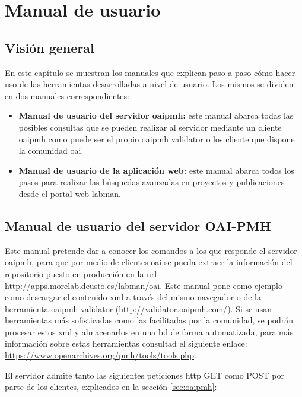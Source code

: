 \chapter{Manual de usuario}

\section{Visión general}

En este capítulo se muestran los manuales que explican paso a paso cómo hacer uso de las herramientas desarrolladas a nivel de usuario. Los mismos se dividen en dos manuales correspondientes:

\begin{itemize}
	\item \textbf{Manual de usuario del servidor \acrshort{oaipmh}:} este manual abarca todas las posibles consultas que se pueden realizar al servidor mediante un cliente \acrshort{oaipmh} como puede ser el propio \acrshort{oaipmh} validator o los cliente que dispone la comunidad \acrshort{oai}.
	\item \textbf{Manual de usuario de la aplicación web:} este manual abarca todos los pasos para realizar las búsquedas avanzadas en proyectos y publicaciones desde el portal web \acrshort{labman}.
\end{itemize}

\section{Manual de usuario del servidor OAI-PMH}

Este manual pretende dar a conocer los comandos a los que responde el servidor \acrshort{oaipmh}, para que por medio de clientes \acrshort{oai} se pueda extraer la información del repositorio puesto en producción en la \acrshort{url} \url{http://apps.morelab.deusto.es/labman/oai}. Este manual pone como ejemplo como descargar el contenido \acrshort{xml} a través del mismo navegador o de la herramienta \acrshort{oaipmh} validator (\url{http://validator.oaipmh.com/}). Si se usan herramientas más sofisticadas como las facilitadas por la comunidad, se podrán procesar estos \acrshort{xml} y almacenarlos en una \acrshort{bd} de forma automatizada, para más información sobre estas herramientas consultad el siguiente enlace: \url{https://www.openarchives.org/pmh/tools/tools.php}.

El servidor admite tanto las siguientes peticiones \acrshort{http} GET como POST por parte de los clientes, explicados en la sección \ref{sec:oaipmh}:

